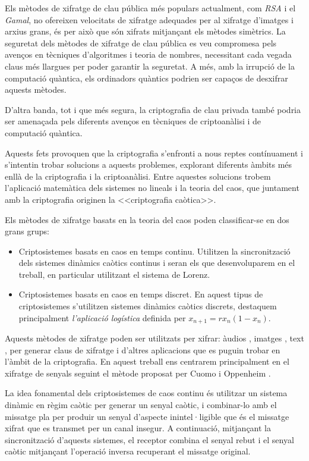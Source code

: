 \documentclass[11pt,a4paper,openright,oneside]{article}
\numberwithin{equation}{section}
\theoremstyle{definition}
\begin{document}
Els mètodes de xifratge de clau pública més populars actualment, com \textit{RSA} i el \textit{Gamal}, no ofereixen velocitats de xifratge adequades per al xifratge d'imatges i arxius grans, és per això que són xifrats mitjançant els mètodes simètrics. La seguretat dels mètodes de xifratge de clau pública es veu compromesa pels avenços en tècniques d'algoritmes i teoria de nombres, necessitant cada vegada claus més llargues per poder garantir la seguretat. A més, amb la irrupció de la computació quàntica, els ordinadors quàntics podrien ser capaços de desxifrar aquests mètodes.

D'altra banda, tot i que més segura, la criptografia de clau privada també podria ser amenaçada pels diferents avenços en tècniques de criptoanàlisi i de computació quàntica.

Aquests fets provoquen que la criptografia s'enfronti a nous reptes contínuament i s'intentin trobar solucions a aquests problemes, explorant diferents àmbits més enllà de la criptografia i la criptoanàlisi. Entre aquestes solucions trobem l'aplicació matemàtica dels sistemes no lineals i la teoria del caos, que juntament amb la criptografia originen la <<criptografia caòtica>>.

Els mètodes de xifratge basats en la teoria del caos poden classificar-se en dos grans grups:

\begin{itemize}
    \item Criptosistemes basats en caos en temps continu. Utilitzen la sincronització dels sistemes dinàmics caòtics continus i seran els que desenvoluparem en el treball, en particular utilitzant el sistema de Lorenz.
    
    \item Criptosistemes basats en caos en temps discret. En aquest tipus de criptosistemes s'utilitzen sistemes dinàmics caòtics discrets, destaquem principalment \textit{l'aplicació logística} definida per $x_{n+1}=rx_n(1-x_n)$.
\end{itemize}

Aquests mètodes de xifratge poden ser utilitzats per xifrar: àudios \cite{Cuomo}, imatges \cite{Imatge}, text \cite{Text}, per generar claus de xifratge \cite{Claus} i d'altres aplicacions que es puguin trobar en l'àmbit de la criptografia. En aquest treball ens centrarem principalment en el xifratge de senyals seguint el mètode proposat per Cuomo i Oppenheim \cite{Cuomo}.

La idea fonamental dels criptosistemes de caos continu és utilitzar un sistema dinàmic en règim caòtic per generar un senyal caòtic, i combinar-lo amb el missatge pla per produir un senyal d'aspecte inintel·ligible que és el missatge xifrat que es transmet per un canal insegur. A continuació, mitjançant la sincronització d'aquests sistemes, el receptor combina el senyal rebut i el senyal caòtic mitjançant l'operació inversa recuperant el missatge original. 
\end{document}
